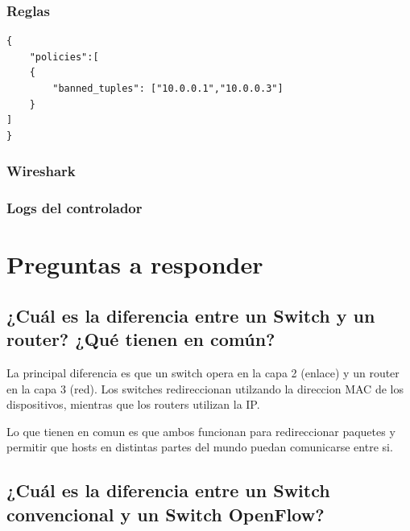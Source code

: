 \documentclass{article}
\begin{document}
\subsubsection{Reglas}

\begin{verbatim}
{
    "policies":[
    {
        "banned_tuples": ["10.0.0.1","10.0.0.3"]
    }
]
}
\end{verbatim}


\subsubsection{Wireshark}
\begin{center}
\end{center}

\subsubsection{Logs del controlador}
\begin{center}
\end{center}

\newpage
\section{\texorpdfstring{\textbf{Preguntas a responder}}{Preguntas a responder}}\label{preguntas-a-responder}

\subsection{\texorpdfstring{\textbf{¿Cuál es la diferencia entre un Switch y un router? ¿Qué tienen en común?}}{1. ¿Cuál es la diferencia entre un Switch y un router? ¿Qué tienen en común?}}\label{describa-la-arquitectura-cliente-servidor.}

La principal diferencia es que un switch opera en la capa 2 (enlace) y un router en la capa 3 (red).
Los switches redireccionan utilzando la direccion MAC de los dispositivos, mientras que los
routers utilizan la IP.

Lo que tienen en comun es que ambos funcionan para redireccionar paquetes y permitir
que hosts en distintas partes del mundo puedan comunicarse entre si.

\subsection{\texorpdfstring{\textbf{¿Cuál es la diferencia entre un Switch convencional y un Switch OpenFlow?}}{¿Cuál es la diferencia entre un Switch convencional y un Switch OpenFlow?}}\label{detalle-el-protocolo-de-aplicaciuxf3n-desarrollado-en-este-trabajo.}
\end{document}
